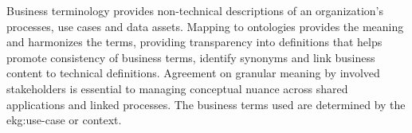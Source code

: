 %
%
Business terminology provides non-technical descriptions of an organization’s processes, use cases
and data assets.
Mapping to ontologies provides the meaning and harmonizes the terms,
providing transparency into definitions that helps promote consistency of business terms,
identify synonyms and link business content to technical definitions.
Agreement on granular meaning by involved stakeholders is essential to managing conceptual nuance across
shared applications and linked processes.
The business terms used are determined by the \gls{ekg:use-case} or context.
